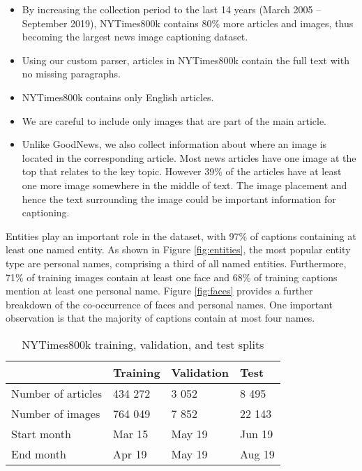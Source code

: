 \documentclass[10pt,twocolumn,letterpaper]{article}
\begin{document}
\begin{itemize}
   \item By increasing the collection period to the last 14 years (March 2005
   -- September 2019), NYTimes800k contains 80\% more articles and images, thus
   becoming the largest news image captioning dataset.
   \item Using our custom parser, articles in NYTimes800k contain the full text
   with no missing paragraphs.
   \item NYTimes800k contains only English articles.
   \item We are careful to include only images that are part of the main
   article.
   \item Unlike GoodNews, we also collect information about where an image is
   located in the corresponding article. Most news articles have one image at
   the top that relates to the key topic. However 39\% of the articles have at
   least one more image somewhere in the middle of text. The image placement
   and hence the text surrounding the image could be important information for
   captioning.
\end{itemize}

Entities play an important role in the dataset, with 97\% of captions
containing at least one named entity. As shown in Figure \ref{fig:entities},
the most popular entity type are personal names, comprising a third of all
named entities. Furthermore, 71\% of training images contain at least one face
and 68\% of training captions mention at least one personal name. Figure
\ref{fig:faces} provides a further breakdown of the co-occurrence of faces and
personal names. One important observation is that the majority of captions
contain at most four names.


\begin{table}[t]
	\caption {NYTimes800k training, validation, and test splits}
	\label{tab:splits}
	\centering
	\begin{tabular}{llll}
		\toprule
		  & Training  &   Validation & Test \\
		\midrule
      Number of articles & 434 272 & 3 052 & 8 495 \\
      Number of images  & 764 049 & 7 852 & 22 143 \\
      Start month & Mar 15 & May 19 & Jun 19 \\
      End month & Apr 19 & May 19 & Aug 19 \\
		\bottomrule
	\end{tabular}
\end{table}
\end{document}
